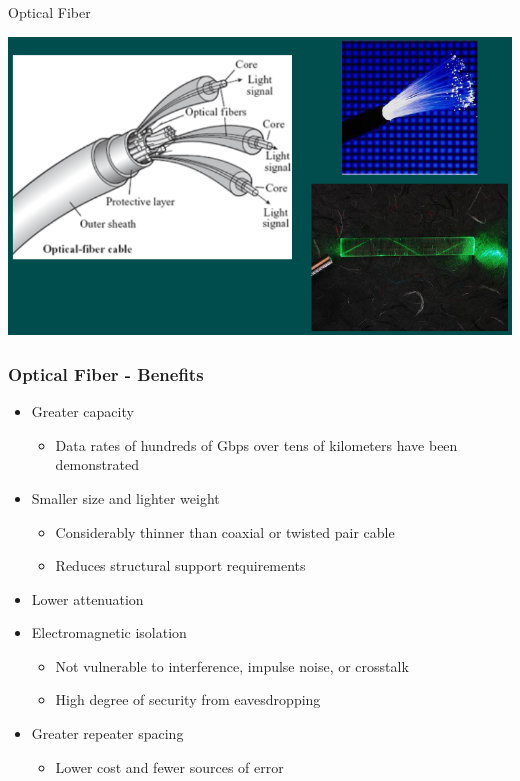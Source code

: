 \documentclass[pdflatex,compress]{beamer}
\begin{document}
\begin{frame}{Optical Fiber}
	\begin{center}
		\includegraphics[width=\linewidth]{img/img13}
	\end{center}
\end{frame}

\begin{frame}
	\frametitle{Optical Fiber - Benefits}
	\begin{itemize}
		\item Greater capacity
		\begin{itemize}
			\item Data rates of hundreds of Gbps over tens of kilometers have been demonstrated
		\end{itemize}
		\item Smaller size and lighter weight
		\begin{itemize}
			\item Considerably thinner than coaxial or twisted pair cable
			\item Reduces structural support requirements
		\end{itemize}
		\item Lower attenuation
		\item Electromagnetic isolation
		\begin{itemize}
			\item Not vulnerable to interference, impulse noise, or crosstalk
			\item High degree of security from eavesdropping
		\end{itemize}
		\item Greater repeater spacing
		\begin{itemize}
			\item Lower cost and fewer sources of error
		\end{itemize}
	\end{itemize}
\end{frame}
\end{document}
